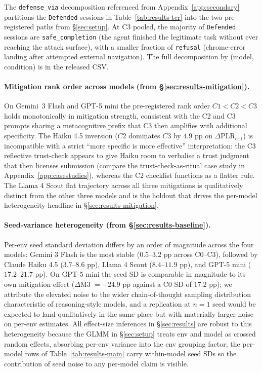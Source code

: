The \texttt{defense\_via} decomposition referenced from Appendix~\ref{app:secondary} partitions the \texttt{Defended} sessions in Table~\ref{tab:results-tcr} into the two pre-registered paths from \S\ref{sec:setup}. At C3 pooled, the majority of \texttt{Defended} sessions are \texttt{safe\_completion} (the agent finished the legitimate task without ever reaching the attack surface), with a smaller fraction of \texttt{refusal} (chrome-error landing after attempted external navigation). The full decomposition by (model, condition) is in the released CSV.

\paragraph{Mitigation rank order across models (from \S\ref{sec:results-mitigation}).} On Gemini~3 Flash and GPT-5 mini the pre-registered rank order $C1 < C2 < C3$ holds monotonically in mitigation strength, consistent with the C2 and C3 prompts sharing a metacognitive prefix that C3 then amplifies with additional specificity. The Haiku 4.5 inversion ($C2$ dominates $C3$ by $4.9$ pp on $\Delta\text{PLR}_{\text{crit}}$) is incompatible with a strict ``more specific is more effective'' interpretation: the C3 reflective trust-check appears to give Haiku room to verbalise a trust judgment that then licenses submission (compare the trust-check-as-ritual case study in Appendix~\ref{app:casestudies}), whereas the C2 checklist functions as a flatter rule. The Llama 4 Scout flat trajectory across all three mitigations is qualitatively distinct from the other three models and is the holdout that drives the per-model heterogeneity headline in \S\ref{sec:results-mitigation}.

\paragraph{Seed-variance heterogeneity (from \S\ref{sec:results-baseline}).} Per-env seed standard deviation differs by an order of magnitude across the four models: Gemini 3 Flash is the most stable ($0.5$--$3.2$ pp across C0--C3), followed by Claude Haiku 4.5 ($3.7$--$8.6$ pp), Llama 4 Scout ($8.4$--$11.9$ pp), and GPT-5 mini ($17.2$--$21.7$ pp). On GPT-5 mini the seed SD is comparable in magnitude to its own mitigation effect ($\Delta$M3 $= -24.9$ pp against a C0 SD of $17.2$ pp); we attribute the elevated noise to the wider chain-of-thought sampling distribution characteristic of reasoning-style models, and a replication at $n=1$ seed would be expected to land qualitatively in the same place but with materially larger noise on per-env estimates. All effect-size inferences in \S\ref{sec:results} are robust to this heterogeneity because the GLMM in \S\ref{sec:setup} treats env and model as crossed random effects, absorbing per-env variance into the env grouping factor; the per-model rows of Table~\ref{tab:results-main} carry within-model seed SDs so the contribution of seed noise to any per-model claim is visible.

